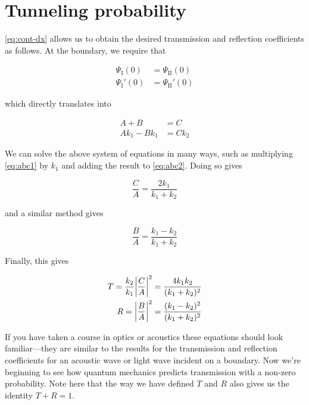 \section{Tunneling probability}

\autoref{eq:cont-dx} allows us to obtain the desired transmission and reflection coefficients as follows. 
At the boundary, we require that 

\begin{align*}
	\Psi_{\text{I}}(0) &= \Psi_{\text{II}}(0) \\
	\Psi_{\text{I}}'(0) &= \Psi_{\text{II}}'(0)
\end{align*}

\noindent which directly translates into

\begin{align}
	A + B &= C \label{eq:abc1} \\
	Ak_1 - Bk_1 &= Ck_2 \label{eq:abc2}
\end{align}

We can solve the above system of equations in many ways, such as multiplying \autoref{eq:abc1} by $k_1$ and adding the result to \autoref{eq:abc2}. 
Doing so gives

\begin{equation}
	\frac{C}{A} = \frac{2k_1}{k_1+k_2} \label{eq:c-a}
\end{equation}

\noindent and a similar method gives 

\begin{equation}
	\frac{B}{A} = \frac{k_1 - k_2}{k_1 + k_2} \label{eq:b-a}
\end{equation}

Finally, this gives 

\begin{tcolorbox}[title = $T$ and $R$ for finite potential step] \vspace{-2ex}
	\begin{align}
		T = \frac{k_2}{k_1}\abs{\frac{C}{A}}^2 &= \frac{4k_1k_2}{(k_1+k_2)^2} \label{eq:t-step} \\ 
		R = \abs{\frac{B}{A}}^2 &= \frac{(k_1-k_2)^2}{(k_1+k_2)^2} \label{eq:r-step}
	\end{align}
\end{tcolorbox}

If you have taken a course in optics or acoustics these equations should look familiar---they are similar to the results for the transmission and reflection coefficients for an acoustic wave or light wave incident on a boundary. 
Now we're beginning to see how quantum mechanics predicts transmission with a non-zero probability. 
Note here that the way we have defined $T$ and $R$ also gives us the identity $T + R = 1$.


